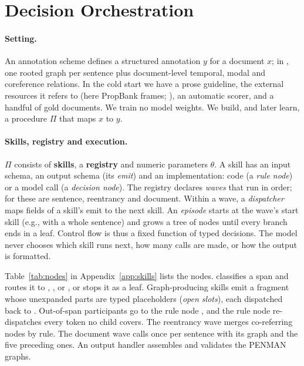 \section{Decision Orchestration}
\label{sec:method}

\paragraph{Setting.}
An annotation scheme defines a structured annotation $y$ for a document $x$; in \umr, one rooted graph per sentence plus document-level temporal, modal and coreference relations. In the cold start we have a prose guideline, the external resources it refers to (here PropBank frames; \citealp{palmer2005propbank}), an automatic scorer, and a handful of gold documents. We train no model weights. We build, and later learn, a procedure $\Pi$ that maps $x$ to $y$.

\paragraph{Skills, registry and execution.}
$\Pi$ consists of \textbf{skills}, a \textbf{registry} and numeric parameters $\theta$. A skill has an input schema, an output schema (its \emph{emit}) and an implementation: code (a \emph{rule node}) or a model call (a \emph{decision node}). The registry declares \emph{waves} that run in order; for \umr these are sentence, reentrancy and document. Within a wave, a \emph{dispatcher} maps fields of a skill's emit to the next skill. An \emph{episode} starts at the wave's start skill (e.g., with a whole sentence) and grows a tree of nodes until every branch ends in a leaf. Control flow is thus a fixed function of typed decisions. The model never chooses which skill runs next, how many calls are made, or how the output is formatted.

Table~\ref{tab:nodes} in Appendix~\ref{app:skills} lists the \umr nodes.  classifies a span and routes it to , ,  or , or stops it as a leaf. Graph-producing skills emit a fragment whose unexpanded parts are typed placeholders (\emph{open slots}), each dispatched back to . Out-of-span participants go to the rule node , and the rule node  re-dispatches every token no child covers. The reentrancy wave merges co-referring nodes by rule. The document wave calls  once per sentence with its graph and the five preceding ones. An output handler assembles and validates the PENMAN graphs.

